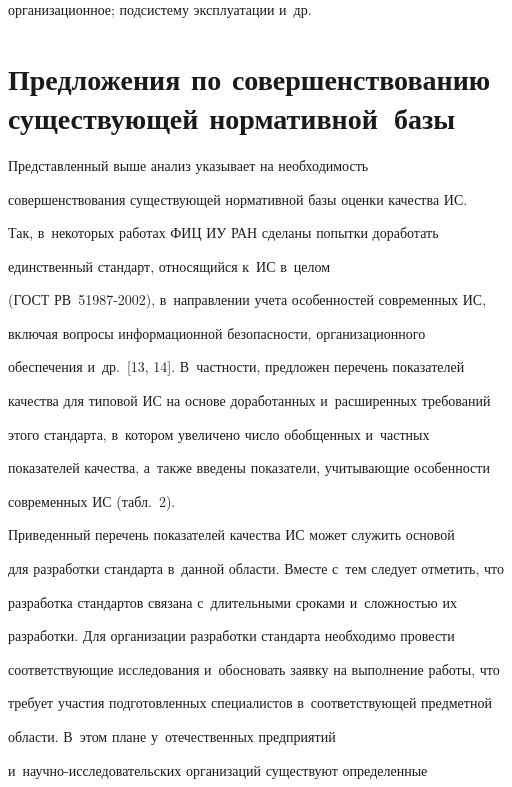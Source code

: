 организационное; под\-сис\-те\-му эксплуатации и~др.  



\section{Предложения по совершенствованию существующей нормативной~базы}



     Представленный выше анализ указывает на необходимость 

совершенствования существующей нормативной базы оценки качества ИС. 

Так, в~некоторых работах ФИЦ ИУ РАН сделаны попытки доработать 

единственный стандарт, относящийся к~ИС в~целом 

(ГОСТ РВ~51987-2002), в~на\-прав\-ле\-нии учета особенностей современных ИС, 

включая вопросы информационной безопас\-ности, организационного 

обеспечения и~др.~[13, 14]. В~част\-ности, предложен перечень показателей 

качества для типовой ИС на основе доработанных и~расширенных требований 

этого стандарта, в~котором увеличено чис\-ло обобщенных и~част\-ных 

показателей качества, а~также введены показатели, учитывающие особенности 

современных ИС (табл.~2).

     





     

     Приведенный перечень показателей качества ИС может служить основой 

для разработки стандарта в~данной области. Вместе с~тем следует отметить, что 

разработка стандартов связана с~длительными сроками и~сложностью их 

разработки. Для организации разработки стандарта необходимо провести 

соответствующие исследования и~обосновать заявку на выполнение работы, что 

требует участия подготовленных специалистов в~соответствующей предметной 

области. В~этом плане у~отечественных предприятий  

и~на\-уч\-но-ис\-сле\-до\-ва\-тель\-ских организаций существуют определенные 

